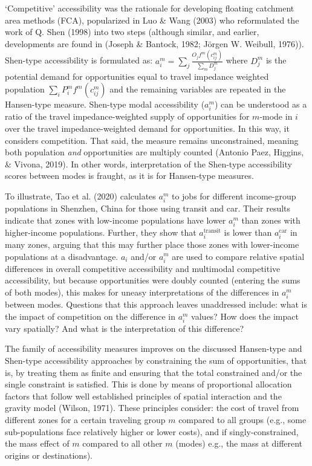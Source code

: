 \documentclass[
11pt, %
oneside, %
english, %
singlespacing, %
]{macthesis} %
\begin{document}
`Competitive' accessibility was the rationale for developing floating catchment area methods (FCA), popularized in Luo \& Wang (2003) who reformulated the work of Q. Shen (1998) into two steps (although similar, and earlier, developments are found in (Joseph \& Bantock, 1982; Jörgen W. Weibull, 1976)). Shen-type accessibility is formulated as: \(a_i^m = \sum_j \frac{O_jf^m(c_{ij}^m)}{\sum_m D_j^m}\) where \(D_j^m\) is the potential demand for opportunities equal to travel impedance weighted population \(\sum_i P_i^m f^m(c_{ij}^m)\) and the remaining variables are repeated in the Hansen-type measure. Shen-type modal accessibility (\(a_i^m\)) can be understood as a ratio of the travel impedance-weighted supply of opportunities for \(m\)-mode in \(i\) over the travel impedance-weighted demand for opportunities. In this way, it considers competition. That said, the measure remains unconstrained, meaning both population \emph{and} opportunities are multiply counted (Antonio Paez, Higgins, \& Vivona, 2019). In other words, interpretation of the Shen-type accessibility scores between modes is fraught, as it is for Hansen-type measures.

To illustrate, Tao et al. (2020) calculates \(a_i^m\) to jobs for different income-group populations in Shenzhen, China for those using transit and car. Their results indicate that zones with low-income populations have lower \(a_i^m\) than zones with higher-income populations. Further, they show that \(a_i^{\text{transit}}\) is lower than \(a_i^{\text{car}}\) in many zones, arguing that this may further place those zones with lower-income populations at a disadvantage. \(a_i\) and/or \(a_i^m\) are used to compare relative spatial differences in overall competitive accessibility and multimodal competitive accessibility, but because opportunities were doubly counted (entering the sums of both modes), this makes for uneasy interpretations of the differences in \(a_i^{m}\) between modes. Questions that this approach leaves unaddressed include: what is the impact of competition on the difference in \(a_i^m\) values? How does the impact vary spatially? And what is the interpretation of this difference?

The family of accessibility measures improves on the discussed Hansen-type and Shen-type accessibility approaches by constraining the sum of opportunities, that is, by treating them as finite and ensuring that the total constrained and/or the single constraint is satisfied. This is done by means of proportional allocation factors that follow well established principles of spatial interaction and the gravity model (Wilson, 1971). These principles consider: the cost of travel from different zones for a certain traveling group \(m\) compared to all groups (e.g., some sub-populations face relatively higher or lower costs), and if singly-constrained, the mass effect of \(m\) compared to all other \(m\) (modes) e.g., the mass at different origins or destinations).
\end{document}

